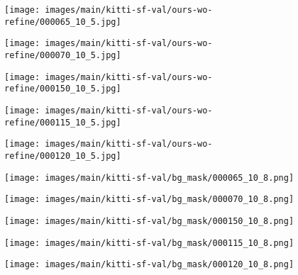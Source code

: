 \documentclass[10pt,twocolumn,letterpaper]{article}
\begin{document}
\begin{figure*}
    \begin{subfigure}[b]{0.02\linewidth}
        \centering
    \end{subfigure}\hfill
    \begin{subfigure}[b]{0.19\linewidth}
        \texttt{[image: images/main/kitti-sf-val/ours-wo-refine/000065\_10\_5.jpg]}
    \end{subfigure}\hfill
    \begin{subfigure}[b]{0.19\linewidth}
        \texttt{[image: images/main/kitti-sf-val/ours-wo-refine/000070\_10\_5.jpg]}
    \end{subfigure}\hfill
    \begin{subfigure}[b]{0.19\linewidth}
        \texttt{[image: images/main/kitti-sf-val/ours-wo-refine/000150\_10\_5.jpg]}
    \end{subfigure}\hfill
    \begin{subfigure}[b]{0.19\linewidth}
        \texttt{[image: images/main/kitti-sf-val/ours-wo-refine/000115\_10\_5.jpg]}
    \end{subfigure}\hfill
    \begin{subfigure}[b]{0.19\linewidth}
        \texttt{[image: images/main/kitti-sf-val/ours-wo-refine/000120\_10\_5.jpg]}
    \end{subfigure}\hfill
    \begin{subfigure}[b]{0.02\linewidth}
        \hspace{10pt}
    \end{subfigure}\hfill

    \begin{subfigure}[b]{0.02\linewidth}
        \centering
    \end{subfigure}\hfill
    \begin{subfigure}[b]{0.19\linewidth}
        \texttt{[image: images/main/kitti-sf-val/bg\_mask/000065\_10\_8.png]}
    \end{subfigure}\hfill
    \begin{subfigure}[b]{0.19\linewidth}
        \texttt{[image: images/main/kitti-sf-val/bg\_mask/000070\_10\_8.png]}
    \end{subfigure}\hfill
    \begin{subfigure}[b]{0.19\linewidth}
        \texttt{[image: images/main/kitti-sf-val/bg\_mask/000150\_10\_8.png]}
    \end{subfigure}\hfill
    \begin{subfigure}[b]{0.19\linewidth}
        \texttt{[image: images/main/kitti-sf-val/bg\_mask/000115\_10\_8.png]}
    \end{subfigure}\hfill
    \begin{subfigure}[b]{0.19\linewidth}
        \texttt{[image: images/main/kitti-sf-val/bg\_mask/000120\_10\_8.png]}
    \end{subfigure}\hfill
    \begin{subfigure}[b]{0.02\linewidth}
        \hspace{10pt}
    \end{subfigure}\hfill


\end{figure*}
\end{document}
